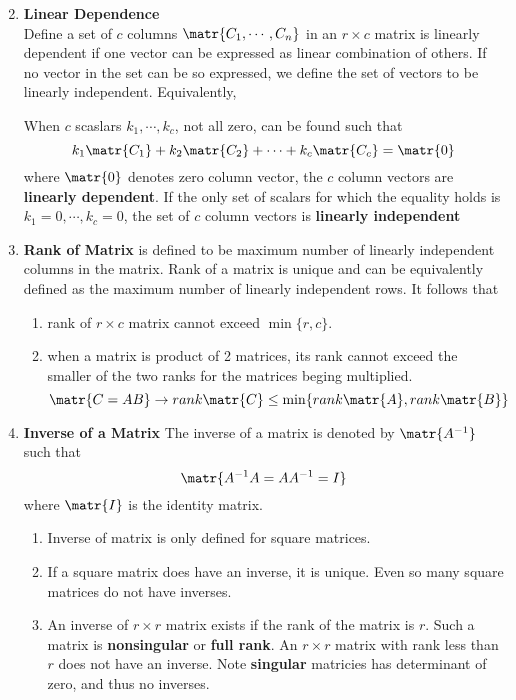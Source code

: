 \documentclass[11pt]{article}
\begin{document}
\begin{defn*}
\begin{enumerate}
\begin{enumerate}
\[            \]
        \end{enumerate}
        \item \textbf{Linear Dependence} \\ 
        Define a set of $c$ columns $\matr{C_1, \cdots, C_n}$ in an $r\times c$ matrix is linearly dependent if one vector can be expressed as linear combination of others. If no vector in the set can be so expressed, we define the set of vectors to be linearly independent. Equivalently, 
        \begin{center}
            When $c$ scaslars $k_1, \cdots, k_c$, not all zero, can be found such that 
            \[
                k_1 \matr{C_1} + k_2 \matr{C_2} + \cdots + k_c \matr{C_c} = \matr{0}
            \]
            where $\matr{0}$ denotes zero column vector, the $c$ column vectors are \textbf{linearly dependent}. If the only set of scalars for which the equality holds is $k_1 = 0, \cdots, k_c = 0$, the set of $c$ column vectors is \textbf{linearly independent}
        \end{center}
        \item \textbf{Rank of Matrix} is defined to be maximum number of linearly independent columns in the matrix. Rank of a matrix is unique and can be equivalently defined as the maximum number of linearly independent rows. It follows that 
        \begin{enumerate}
            \item rank of $r\times c$ matrix cannot exceed $\min\{r, c\}$. 
            \item when a matrix is product of 2 matrices, its rank cannot exceed the smaller of the two ranks for the matrices beging multiplied.
            \[
                \matr{C=AB} \to rank\matr{C} \leq \min\{ rank\matr{A}, rank\matr{B}\}
            \]
        \end{enumerate}
        \item \textbf{Inverse of a Matrix} The inverse of a matrix is denoted by $\matr{A^{-1}}$ such that 
        \[
            \matr{A^{-1}A = AA^{-1} = I}
        \]
        where $\matr{I}$ is the identity matrix. 
        \begin{enumerate}
            \item Inverse of matrix is only defined for square matrices.
            \item If a square matrix does have an inverse, it is unique. Even so many square matrices do not have inverses.
            \item An inverse of $r\times r$ matrix exists if the rank of the matrix is $r$. Such a matrix is \textbf{nonsingular} or \textbf{full rank}. An $r\times r$ matrix with rank less than $r$ does not have an inverse. Note \textbf{singular} matricies has determinant of zero, and thus no inverses.

\end{enumerate}
\end{enumerate}
\end{defn*}
\end{document}
